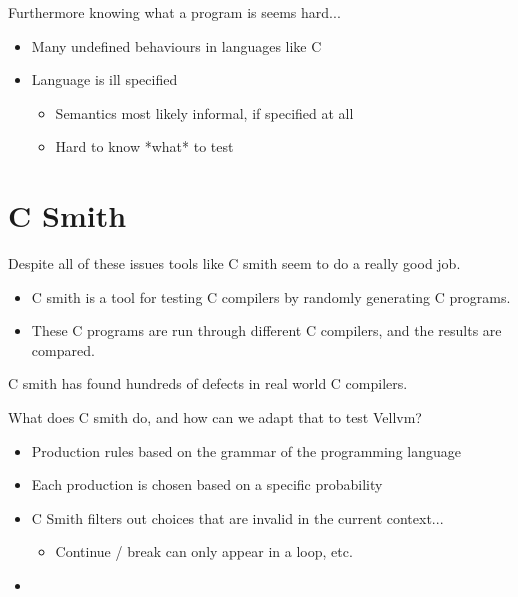\documentclass{beamer}
\begin{document}
\begin{frame}
  Furthermore knowing what a program is seems hard...

  \begin{itemize}
  \item Many undefined behaviours in languages like C
  \item Language is ill specified
    \begin{itemize}
    \item Semantics most likely informal, if specified at all
    \item Hard to know *what* to test
    \end{itemize}
  \end{itemize}
\end{frame}

\section{C Smith}

\begin{frame}

  Despite all of these issues tools like C smith seem to do a really
  good job.

  \begin{itemize}
  \item C smith is a tool for testing C compilers by randomly
    generating C programs.
  \item These C programs are run through different C compilers, and
    the results are compared.
  \end{itemize}

  C smith has found hundreds of defects in real world C compilers.
\end{frame}

\begin{frame}
  What does C smith do, and how can we adapt that to test Vellvm?

  \begin{itemize}
  \item Production rules based on the grammar of the programming
    language
  \item Each production is chosen based on a specific probability
  \item C Smith filters out choices that are invalid in the current
    context...
    \begin{itemize}
    \item Continue / break can only appear in a loop, etc.
    \end{itemize}
  \item 
  \end{itemize}
\end{frame}
\end{document}
